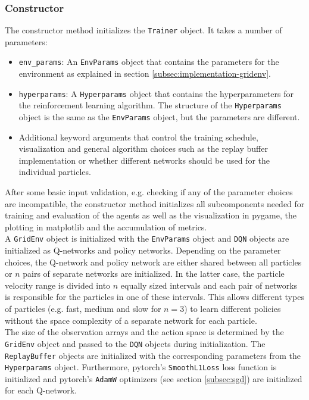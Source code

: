 \subsubsection{Constructor}
The constructor method initializes the \texttt{Trainer} object. It takes a number of parameters:
\begin{itemize}
    \item \texttt{env\_params}: An \texttt{EnvParams} object that contains the parameters for the environment as explained in section \ref{subsec:implementation-gridenv}.
    \item \texttt{hyperparams}: A \texttt{Hyperparams} object that contains the hyperparameters for the reinforcement learning algorithm. The structure of the \texttt{Hyperparams} object is the same as the \texttt{EnvParams} object, but the parameters are different.
    \item Additional keyword arguments that control the training schedule, visualization and general algorithm choices such as the replay buffer implementation or whether different networks should be used for the individual particles.
\end{itemize}
After some basic input validation, e.g. checking if any of the parameter choices are incompatible, the constructor method initializes all subcomponents needed for training and evaluation of the agents as well as the visualization in pygame, the plotting in matplotlib and the accumulation of metrics.
\\
A \texttt{GridEnv} object is initialized with the \texttt{EnvParams} object and \texttt{DQN} objects are initialized as Q-networks and policy networks. Depending on the parameter choices, the Q-network and policy network are either shared between all particles or $n$ pairs of separate networks are initialized. In the latter case, the particle velocity range is divided into $n$ equally sized intervals and each pair of networks is responsible for the particles in one of these intervals. This allows different types of particles (e.g. fast, medium and slow for $n=3$) to learn different policies without the space complexity of a separate network for each particle.
\\
The size of the observation arrays and the action space is determined by the \texttt{GridEnv} object and passed to the \texttt{DQN} objects during initialization. The \texttt{ReplayBuffer} objects are initialized with the corresponding parameters from the \texttt{Hyperparams} object. Furthermore, pytorch's \texttt{SmoothL1Loss} loss function is initialized and pytorch's \texttt{AdamW} optimizers (see section \ref{subsec:sgd}) are initialized for each Q-network. 


